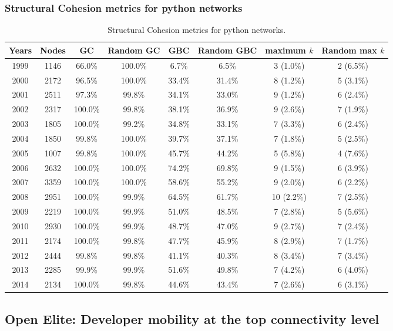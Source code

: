 \documentclass[ignorenonframetext,red,8pt,notes=hide]{beamer}
\begin{document}
\begin{frame}
\frametitle{Structural Cohesion metrics for python networks}
\begin{table}[H]
\begin{center}
\begin{footnotesize}
\begin{tabular}{|c|c|c|c|c|c|c|c|}
\hline
Years&Nodes&GC&Random GC&GBC&Random GBC&maximum $k$&Random max $k$\\
\hline
1999&1146&66.0\%&100.0\%&6.7\%&6.5\%&3 (1.0\%)&2 (6.5\%)\\
2000&2172&96.5\%&100.0\%&33.4\%&31.4\%&8 (1.2\%)&5 (3.1\%)\\
2001&2511&97.3\%&99.8\%&34.1\%&33.0\%&9 (1.2\%)&6 (2.4\%)\\
2002&2317&100.0\%&99.8\%&38.1\%&36.9\%&9 (2.6\%)&7 (1.9\%)\\
2003&1805&100.0\%&99.2\%&34.8\%&33.1\%&7 (3.3\%)&6 (2.4\%)\\
2004&1850&99.8\%&100.0\%&39.7\%&37.1\%&7 (1.8\%)&5 (2.5\%)\\
2005&1007&99.8\%&100.0\%&45.7\%&44.2\%&5 (5.8\%)&4 (7.6\%)\\
2006&2632&100.0\%&100.0\%&74.2\%&69.8\%&9 (1.5\%)&6 (3.9\%)\\
2007&3359&100.0\%&100.0\%&58.6\%&55.2\%&9 (2.0\%)&6 (2.2\%)\\
2008&2951&100.0\%&99.9\%&64.5\%&61.7\%&10 (2.2\%)&7 (2.5\%)\\
2009&2219&100.0\%&99.9\%&51.0\%&48.5\%&7 (2.8\%)&5 (5.6\%)\\
2010&2930&100.0\%&99.9\%&48.7\%&47.0\%&9 (2.7\%)&7 (2.4\%)\\
2011&2174&100.0\%&99.8\%&47.7\%&45.9\%&8 (2.9\%)&7 (1.7\%)\\
2012&2444&99.8\%&99.8\%&41.1\%&40.3\%&8 (3.4\%)&7 (3.4\%)\\
2013&2285&99.9\%&99.9\%&51.6\%&49.8\%&7 (4.2\%)&6 (4.0\%)\\
2014&2134&100.0\%&99.8\%&44.6\%&43.4\%&7 (2.6\%)&6 (3.1\%)\\
\hline
\end{tabular}
\caption{Structural Cohesion metrics for python networks.}
\label{str_cohesion_python}
\end{footnotesize}
\end{center}
\end{table}


\end{frame}

\subsection*{Open Elite: Developer mobility at the top connectivity level}
\end{document}

